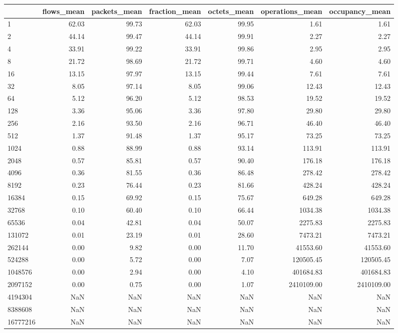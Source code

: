 \begin{tabular}{lrrrrrr}
\toprule
 & flows_mean & packets_mean & fraction_mean & octets_mean & operations_mean & occupancy_mean \\
\midrule
1 & 62.03 & 99.73 & 62.03 & 99.95 & 1.61 & 1.61 \\
2 & 44.14 & 99.47 & 44.14 & 99.91 & 2.27 & 2.27 \\
4 & 33.91 & 99.22 & 33.91 & 99.86 & 2.95 & 2.95 \\
8 & 21.72 & 98.69 & 21.72 & 99.71 & 4.60 & 4.60 \\
16 & 13.15 & 97.97 & 13.15 & 99.44 & 7.61 & 7.61 \\
32 & 8.05 & 97.14 & 8.05 & 99.06 & 12.43 & 12.43 \\
64 & 5.12 & 96.20 & 5.12 & 98.53 & 19.52 & 19.52 \\
128 & 3.36 & 95.06 & 3.36 & 97.80 & 29.80 & 29.80 \\
256 & 2.16 & 93.50 & 2.16 & 96.71 & 46.40 & 46.40 \\
512 & 1.37 & 91.48 & 1.37 & 95.17 & 73.25 & 73.25 \\
1024 & 0.88 & 88.99 & 0.88 & 93.14 & 113.91 & 113.91 \\
2048 & 0.57 & 85.81 & 0.57 & 90.40 & 176.18 & 176.18 \\
4096 & 0.36 & 81.55 & 0.36 & 86.48 & 278.42 & 278.42 \\
8192 & 0.23 & 76.44 & 0.23 & 81.66 & 428.24 & 428.24 \\
16384 & 0.15 & 69.92 & 0.15 & 75.67 & 649.28 & 649.28 \\
32768 & 0.10 & 60.40 & 0.10 & 66.44 & 1034.38 & 1034.38 \\
65536 & 0.04 & 42.81 & 0.04 & 50.07 & 2275.83 & 2275.83 \\
131072 & 0.01 & 23.19 & 0.01 & 28.60 & 7473.21 & 7473.21 \\
262144 & 0.00 & 9.82 & 0.00 & 11.70 & 41553.60 & 41553.60 \\
524288 & 0.00 & 5.72 & 0.00 & 7.07 & 120505.45 & 120505.45 \\
1048576 & 0.00 & 2.94 & 0.00 & 4.10 & 401684.83 & 401684.83 \\
2097152 & 0.00 & 0.75 & 0.00 & 1.07 & 2410109.00 & 2410109.00 \\
4194304 & NaN & NaN & NaN & NaN & NaN & NaN \\
8388608 & NaN & NaN & NaN & NaN & NaN & NaN \\
16777216 & NaN & NaN & NaN & NaN & NaN & NaN \\
\bottomrule
\end{tabular}
